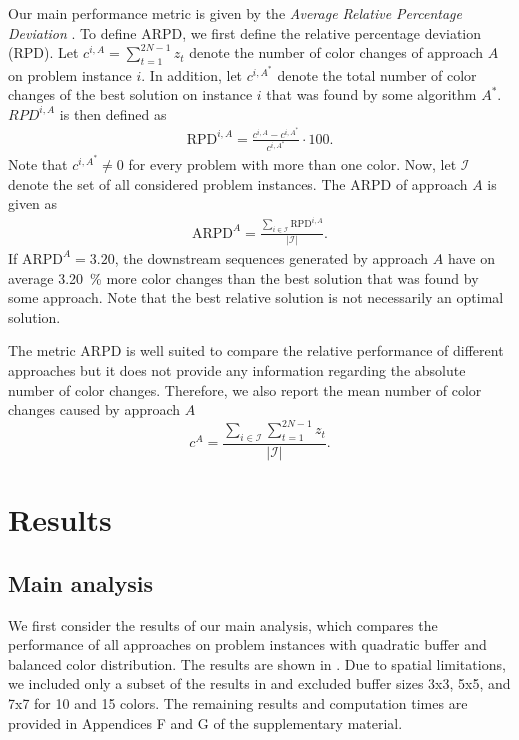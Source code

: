 \documentclass[11pt]{elsarticle}
\begin{document}
Our main performance metric is given by the \emph{Average Relative Percentage Deviation} \citep[ARPD, e.g.,][]{Brammer.2022a,Huang.2024}. To define ARPD, we first define the relative percentage deviation (RPD). Let $c^{i,A}=\sum_{t=1}^{2N-1} z_t$ denote the number of color changes of approach $A$ on problem instance $i$. In addition, let $c^{i,A^*}$ denote the total number of color changes of the best solution on instance $i$ that was found by some algorithm $A^*$. $RPD^{i,A}$ is then defined as
\begin{align}
\text{RPD}^{i,A}=\frac{c^{i,A}  - c^{i,A^*}}{ c^{i,A^*} } \cdot 100.
\label{eqn:rpd}
\end{align}
Note that $c^{i,A^*} \neq 0$ for every problem with more than one color. Now, let $\mathcal{I}$ denote the set of all considered problem instances. The ARPD of approach $A$ is given as
\begin{align}
\text{ARPD}^A=\frac{ \sum_{i \in \mathcal{I}} \text{RPD}^{i,A} }{|\mathcal{I}|}.
\label{eqn:arpd}
\end{align}
If $\text{ARPD}^A =3.20$, the downstream sequences generated by approach $A$ have on average \SI{3.20}{\percent} more color changes than the best solution that was found by some approach. Note that the best relative solution is not necessarily an optimal solution. 

The metric ARPD is well suited to compare the relative performance of different approaches but it does not provide any information regarding the absolute number of color changes. Therefore, we also report the mean number of color changes caused by approach $A$
\begin{equation}
c^{A}=\frac{ \sum_{i \in \mathcal{I}}  \sum_{t=1}^{2N-1} z_t }{|\mathcal{I}|}.
\end{equation}

\section{Results}
\label{section-Results}

\subsection{Main analysis}


We first consider the results of our main analysis, which compares the performance of all approaches on problem instances with quadratic buffer and balanced color distribution. The results are shown in . Due to spatial limitations, we included only a subset of the results in  and excluded buffer sizes 3x3, 5x5, and 7x7 for 10 and 15 colors. The remaining results and computation times are provided in Appendices F and G of the supplementary material. 
\end{document}
